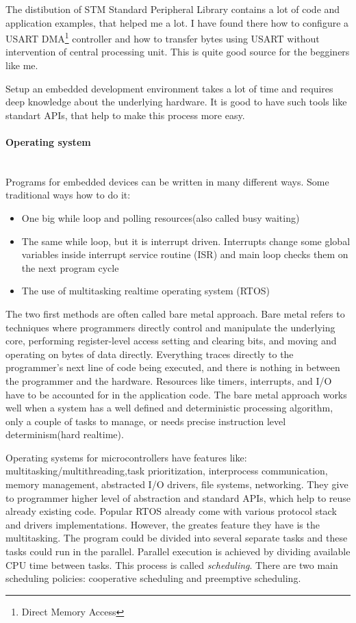 The distibution of STM Standard Peripheral Library contains a lot of
code and application examples, that helped me a lot. I have found there how to
configure a USART DMA\footnote{Direct Memory Access} controller and how to
transfer bytes using USART without intervention of central processing unit.
This is  quite good source for the begginers like me.

Setup an embedded development environment takes a lot of time and requires
deep knowledge about the underlying hardware. It is good to have such tools like
standart APIs, that help to make this process more easy.

\paragraph{Operating system} ~\\
Programs for embedded devices can be written in many different ways.
Some traditional ways how to do it:
\begin{itemize}
\item One big while loop and polling resources(also called busy waiting)
\item The same while loop, but it is interrupt driven.
Interrupts change some global variables inside interrupt service routine (ISR)
and main loop checks them on the next program cycle
\item The use of multitasking realtime operating system (RTOS) 
\end{itemize} 

The two first methods are often called bare metal approach.
Bare metal refers to techniques where programmers directly control and manipulate the underlying core, performing register-level access setting and clearing bits, and moving and operating on bytes of data directly.
Everything traces directly to the programmer’s next line of code being executed, and there is nothing in between the programmer and the hardware.
Resources like timers, interrupts, and I/O have to be accounted for in the application code.
The bare metal approach works well when a system has a  well defined and deterministic processing algorithm, only a couple of tasks to manage, or needs precise instruction level determinism(hard realtime).

Operating systems for microcontrollers have features like: 
multitasking/multithreading,task prioritization, interprocess communication, memory management, abstracted I/O drivers, file systems, networking.
They give to programmer higher level of abstraction and standard APIs, which help to reuse already existing code.
Popular RTOS already come with various protocol stack and drivers implementations.
However, the greates feature they have is the multitasking. 
The program could be divided into several separate tasks and these tasks could run in the parallel.
Parallel execution is achieved by dividing available CPU time between tasks.
This process is called \textit{scheduling}. 
There are two main scheduling policies: cooperative scheduling and preemptive scheduling.


